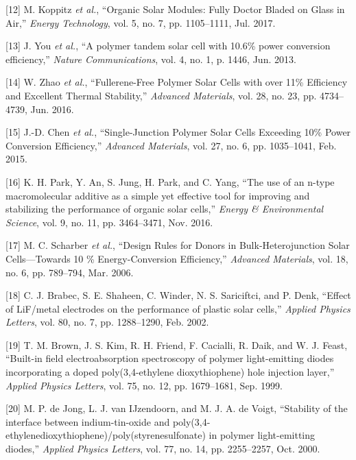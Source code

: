\documentclass[]{article}
\begin{document}
\leavevmode\hypertarget{ref-Koppitz2017}{}%
{[}12{]} M. Koppitz \emph{et al.}, ``Organic Solar Modules: Fully Doctor Bladed on Glass in Air,'' \emph{Energy Technology}, vol. 5, no. 7, pp. 1105--1111, Jul. 2017.

\leavevmode\hypertarget{ref-You2013}{}%
{[}13{]} J. You \emph{et al.}, ``A polymer tandem solar cell with 10.6\% power conversion efficiency,'' \emph{Nature Communications}, vol. 4, no. 1, p. 1446, Jun. 2013.

\leavevmode\hypertarget{ref-Zhao2016}{}%
{[}14{]} W. Zhao \emph{et al.}, ``Fullerene-Free Polymer Solar Cells with over 11\% Efficiency and Excellent Thermal Stability,'' \emph{Advanced Materials}, vol. 28, no. 23, pp. 4734--4739, Jun. 2016.

\leavevmode\hypertarget{ref-Chen2015}{}%
{[}15{]} J.-D. Chen \emph{et al.}, ``Single-Junction Polymer Solar Cells Exceeding 10\% Power Conversion Efficiency,'' \emph{Advanced Materials}, vol. 27, no. 6, pp. 1035--1041, Feb. 2015.

\leavevmode\hypertarget{ref-Park2016}{}%
{[}16{]} K. H. Park, Y. An, S. Jung, H. Park, and C. Yang, ``The use of an n-type macromolecular additive as a simple yet effective tool for improving and stabilizing the performance of organic solar cells,'' \emph{Energy \& Environmental Science}, vol. 9, no. 11, pp. 3464--3471, Nov. 2016.

\leavevmode\hypertarget{ref-Scharber2006}{}%
{[}17{]} M. C. Scharber \emph{et al.}, ``Design Rules for Donors in Bulk-Heterojunction Solar Cells---Towards 10 \% Energy-Conversion Efficiency,'' \emph{Advanced Materials}, vol. 18, no. 6, pp. 789--794, Mar. 2006.

\leavevmode\hypertarget{ref-Brabec2002}{}%
{[}18{]} C. J. Brabec, S. E. Shaheen, C. Winder, N. S. Sariciftci, and P. Denk, ``Effect of LiF/metal electrodes on the performance of plastic solar cells,'' \emph{Applied Physics Letters}, vol. 80, no. 7, pp. 1288--1290, Feb. 2002.

\leavevmode\hypertarget{ref-Brown1999}{}%
{[}19{]} T. M. Brown, J. S. Kim, R. H. Friend, F. Cacialli, R. Daik, and W. J. Feast, ``Built-in field electroabsorption spectroscopy of polymer light-emitting diodes incorporating a doped poly(3,4-ethylene dioxythiophene) hole injection layer,'' \emph{Applied Physics Letters}, vol. 75, no. 12, pp. 1679--1681, Sep. 1999.

\leavevmode\hypertarget{ref-DeJong2000}{}%
{[}20{]} M. P. de Jong, L. J. van IJzendoorn, and M. J. A. de Voigt, ``Stability of the interface between indium-tin-oxide and poly(3,4-ethylenedioxythiophene)/poly(styrenesulfonate) in polymer light-emitting diodes,'' \emph{Applied Physics Letters}, vol. 77, no. 14, pp. 2255--2257, Oct. 2000.
\end{document}
